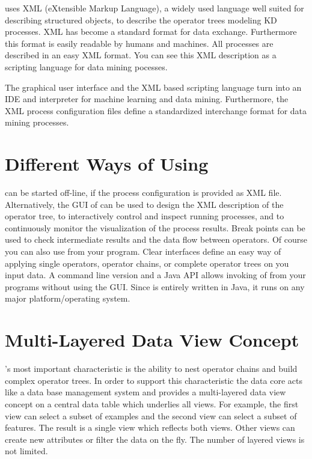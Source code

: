 \rapidminer uses XML (eXtensible Markup Language), a widely used language 
well suited for describing structured objects, to describe the
operator trees modeling KD processes.
   XML has become a standard format for data exchange.
Furthermore this format is easily readable by humans and machines. All
\rapidminer processes are described in an easy XML format. You can see this XML
description as a scripting language for data mining pocesses.

The graphical user interface and the XML based scripting language turn
\rapidminer into an IDE and interpreter for machine learning and data mining. Furthermore, the
XML process configuration files define a standardized interchange format
for data mining processes.




\section{Different Ways of Using \rapidminer}

\rapidminer can be started off-line, if the process configuration is provided
as XML file.
   Alternatively, the GUI of \rapidminer can be used to design the XML description
of the operator tree, to interactively control and inspect running processes, 
and to continuously monitor the visualization of the process results.
Break points can be used to check intermediate results and the data flow
between operators.
Of course you can also use \rapidminer from your program. Clear interfaces define an
easy way of applying single operators, operator chains, or complete operator
trees on you input data. A command line version and a Java API allows
invoking of \rapidminer from your programs without using the GUI. 
Since \rapidminer is entirely written in Java, it runs on any major
platform/operating system.




\section{Multi-Layered Data View Concept}
     

\rapidminer's most important characteristic is the ability to nest operator chains
and build complex operator trees. In order to support this characteristic the
\rapidminer data core acts like a data base management system and provides a
multi-layered data view concept on a central data table which underlies all
views. For example, the first view can select a subset of examples and the
second view can select a subset of features. The result is a single view which
reflects both views. Other views can create new attributes or filter the data
on the fly. The number of layered views is not limited.

